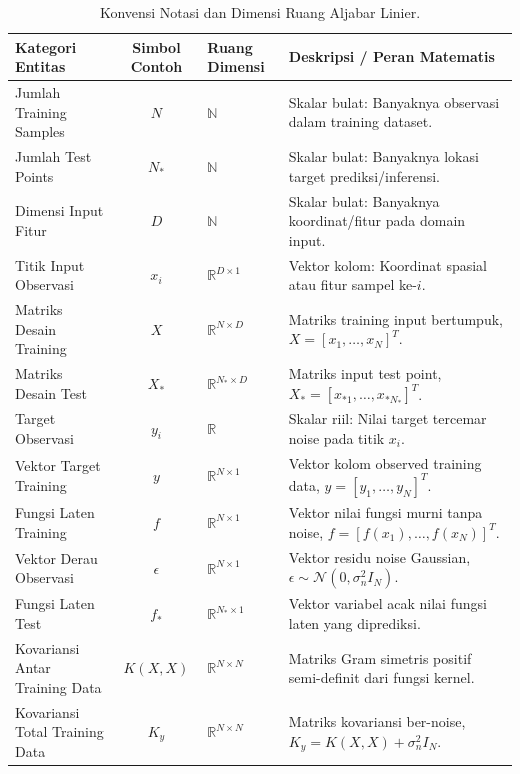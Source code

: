 \documentclass[11pt,a4paper]{article}
\def\boldsymbol#1{#1}%
\def\mathbf#1{#1}%
\begin{document}
\begin{table}[h!]
\centering
\small
\caption{Konvensi Notasi dan Dimensi Ruang Aljabar Linier.}
\label{tab:notasi}
\begin{tabularx}{\textwidth}{l c l X}
\toprule
\textbf{Kategori Entitas} & \textbf{Simbol Contoh} & \textbf{Ruang Dimensi} & \textbf{Deskripsi / Peran Matematis} \\
\midrule
Jumlah Training Samples & $N$ & $\mathbb{N}$ & Skalar bulat: Banyaknya observasi dalam training dataset. \\
Jumlah Test Points & $N_*$ & $\mathbb{N}$ & Skalar bulat: Banyaknya lokasi target prediksi/inferensi. \\
Dimensi Input Fitur & $D$ & $\mathbb{N}$ & Skalar bulat: Banyaknya koordinat/fitur pada domain input. \\
\midrule
Titik Input Observasi & $\mathbf{x}_i$ & $\mathbb{R}^{D \times 1}$ & Vektor kolom: Koordinat spasial atau fitur sampel ke-$i$. \\
Matriks Desain Training & $X$ & $\mathbb{R}^{N \times D}$ & Matriks training input bertumpuk, $X = [\mathbf{x}_1, \dots, \mathbf{x}_N]^T$. \\
Matriks Desain Test & $X_*$ & $\mathbb{R}^{N_* \times D}$ & Matriks input test point, $X_* = [\mathbf{x}_{*1}, \dots, \mathbf{x}_{*N_*}]^T$. \\
\midrule
Target Observasi & $y_i$ & $\mathbb{R}$ & Skalar riil: Nilai target tercemar noise pada titik $\mathbf{x}_i$. \\
Vektor Target Training & $\mathbf{y}$ & $\mathbb{R}^{N \times 1}$ & Vektor kolom observed training data, $\mathbf{y} = [y_1, \dots, y_N]^T$. \\
Fungsi Laten Training & $\mathbf{f}$ & $\mathbb{R}^{N \times 1}$ & Vektor nilai fungsi murni tanpa noise, $\mathbf{f} = [f(\mathbf{x}_1), \dots, f(\mathbf{x}_N)]^T$. \\
Vektor Derau Observasi & $\boldsymbol{\epsilon}$ & $\mathbb{R}^{N \times 1}$ & Vektor residu noise Gaussian, $\boldsymbol{\epsilon} \sim \mathcal{N}(\mathbf{0}, \sigma_n^2 I_N)$. \\
Fungsi Laten Test & $\mathbf{f}_*$ & $\mathbb{R}^{N_* \times 1}$ & Vektor variabel acak nilai fungsi laten yang diprediksi. \\
\midrule
Kovariansi Antar Training Data & $K(X, X)$ & $\mathbb{R}^{N \times N}$ & Matriks Gram simetris positif semi-definit dari fungsi kernel. \\
Kovariansi Total Training Data & $K_y$ & $\mathbb{R}^{N \times N}$ & Matriks kovariansi ber-noise, $K_y = K(X,X) + \sigma_n^2 I_N$. \\

\end{tabularx}
\end{table}
\end{document}

